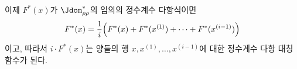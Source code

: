 
이제 $F^*(x)$가 $\Jdom^*_{\rho\rho}$의 임의의 정수계수 다항식이면
\[
  F^*(x)=\frac1i\Bigl(F^*(x)+F^*(x^{(1)})+\cdots+F^*(x^{(i-1)})\Bigr)
\]
이고, 따라서 $i\cdot F^*(x)$는 양들의 행 $x,x^{(1)},\ldots,x^{(i-1)}$에 대한 정수계수 다항 대칭함수가 된다.
